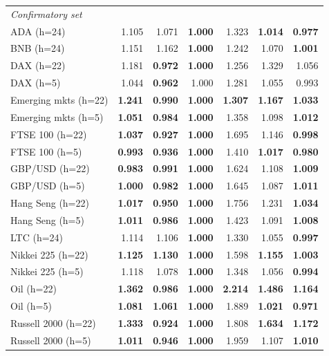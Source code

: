 \begin{tabular}{lrrrrrr}
\midrule
\multicolumn{7}{l}{\textit{Confirmatory set}}\\
ADA (h=24) & 1.105 & 1.071 & \textbf{1.000} & 1.323 & \textbf{1.014} & \textbf{0.977}\\
BNB (h=24) & 1.151 & 1.162 & \textbf{1.000} & 1.242 & 1.070 & \textbf{1.001}\\
DAX (h=22) & 1.181 & \textbf{0.972} & \textbf{1.000} & 1.256 & 1.329 & 1.056\\
DAX (h=5) & 1.044 & \textbf{0.962} & 1.000 & 1.281 & 1.055 & 0.993\\
Emerging mkts (h=22) & \textbf{1.241} & \textbf{0.990} & \textbf{1.000} & \textbf{1.307} & \textbf{1.167} & \textbf{1.033}\\
Emerging mkts (h=5) & \textbf{1.051} & \textbf{0.984} & \textbf{1.000} & 1.358 & 1.098 & \textbf{1.012}\\
FTSE 100 (h=22) & \textbf{1.037} & \textbf{0.927} & \textbf{1.000} & 1.695 & 1.146 & \textbf{0.998}\\
FTSE 100 (h=5) & \textbf{0.993} & \textbf{0.936} & \textbf{1.000} & 1.410 & \textbf{1.017} & \textbf{0.980}\\
GBP/USD (h=22) & \textbf{0.983} & \textbf{0.991} & \textbf{1.000} & 1.624 & 1.108 & \textbf{1.009}\\
GBP/USD (h=5) & \textbf{1.000} & \textbf{0.982} & \textbf{1.000} & 1.645 & 1.087 & \textbf{1.011}\\
Hang Seng (h=22) & \textbf{1.017} & \textbf{0.950} & \textbf{1.000} & 1.756 & 1.231 & \textbf{1.034}\\
Hang Seng (h=5) & \textbf{1.011} & \textbf{0.986} & \textbf{1.000} & 1.423 & 1.091 & \textbf{1.008}\\
LTC (h=24) & 1.114 & 1.106 & \textbf{1.000} & 1.330 & 1.055 & \textbf{0.997}\\
Nikkei 225 (h=22) & \textbf{1.125} & \textbf{1.130} & \textbf{1.000} & 1.598 & \textbf{1.155} & \textbf{1.003}\\
Nikkei 225 (h=5) & 1.118 & 1.078 & \textbf{1.000} & 1.348 & 1.056 & \textbf{0.994}\\
Oil (h=22) & \textbf{1.362} & \textbf{0.986} & \textbf{1.000} & \textbf{2.214} & \textbf{1.486} & \textbf{1.164}\\
Oil (h=5) & \textbf{1.081} & \textbf{1.061} & \textbf{1.000} & 1.889 & \textbf{1.021} & \textbf{0.971}\\
Russell 2000 (h=22) & \textbf{1.333} & \textbf{0.924} & \textbf{1.000} & 1.808 & \textbf{1.634} & \textbf{1.172}\\
Russell 2000 (h=5) & \textbf{1.011} & \textbf{0.946} & \textbf{1.000} & 1.959 & 1.107 & \textbf{1.010}\\

\end{tabular}
